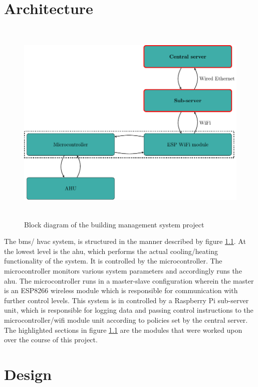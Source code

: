\documentclass[letterpaper,11pt]{report}
\begin{document}
\chapter{Architecture}\label{chapter:architecture}
\onehalfspacing
\begin{figure}[h]
\includegraphics[width=14cm, height=10cm]{arch}
\centering
\captionsetup{justification=centering}
\caption{Block diagram of the building management system project}
\label{fig:arch}
\end{figure}
The \ac{bms}/ \ac{hvac} system, is structured in the manner described by figure \ref{fig:arch}. At the lowest level is the \ac{ahu}, which performs the actual cooling/heating functionality of the system. It is controlled by the microcontroller. The microcontroller monitors various system parameters and accordingly runs the \ac{ahu}. The microcontroller runs in a master-slave configuration wherein the master is an ESP8266 wireless module which is responsible for communication with further control levels. This system is in controlled by a Raspberry Pi sub-server unit, which is responsible for logging data and passing control instructions to the microcontroller/wifi module unit according to policies set by the central server. The highlighted sections in figure \ref{fig:arch} are the modules that were worked upon over the course of this project.

\newpage
\chapter{Design}\label{chapter:Design}
\onehalfspacing
\end{document}
